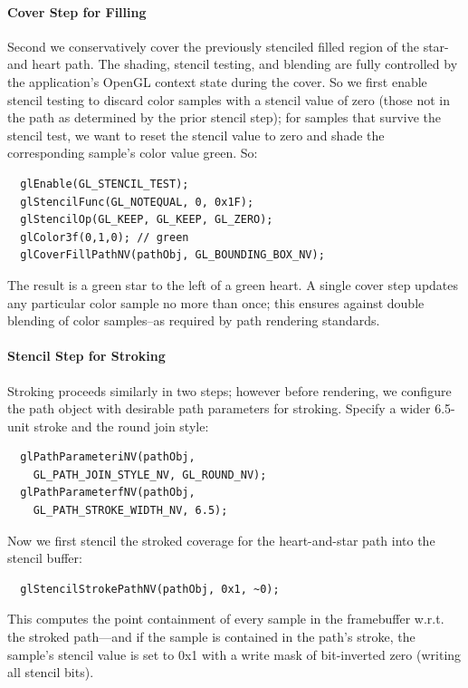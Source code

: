 \paragraph{Cover Step for Filling}

Second we conservatively cover the previously stenciled filled region
of the star-and heart path.  The shading, stencil testing, and blending
are fully controlled by the application's OpenGL context state during
the cover.  So we first enable stencil testing to discard color samples
with a stencil value of zero (those not in the path as determined by
the prior stencil step); for samples that survive the stencil test,
we want to reset the stencil value to zero and shade the corresponding
sample's color value green.  So:
\begin{lstlisting}
  glEnable(GL_STENCIL_TEST);
  glStencilFunc(GL_NOTEQUAL, 0, 0x1F);
  glStencilOp(GL_KEEP, GL_KEEP, GL_ZERO);
  glColor3f(0,1,0); // green
  glCoverFillPathNV(pathObj, GL_BOUNDING_BOX_NV);
\end{lstlisting}
The result is a green star to the left of a green heart.  A single cover step
updates any particular color sample no more than once; this ensures against
double blending of color samples--as required by path rendering standards.

\paragraph{Stencil Step for Stroking}

Stroking proceeds similarly in two steps; however before rendering, we
configure the path object with desirable path parameters for stroking.
Specify a wider 6.5-unit stroke and the round join style:
\begin{lstlisting}
  glPathParameteriNV(pathObj,
    GL_PATH_JOIN_STYLE_NV, GL_ROUND_NV);
  glPathParameterfNV(pathObj,
    GL_PATH_STROKE_WIDTH_NV, 6.5);
\end{lstlisting}
Now we first stencil the stroked coverage for the heart-and-star path
into the stencil buffer:
\begin{lstlisting}
  glStencilStrokePathNV(pathObj, 0x1, ~0);
\end{lstlisting}
This computes the point containment of every sample in the framebuffer
w.r.t. the stroked path---and if the sample is contained in the path's
stroke, the sample's stencil value is set to 0x1 with a write mask of bit-inverted zero
(writing all stencil bits).

